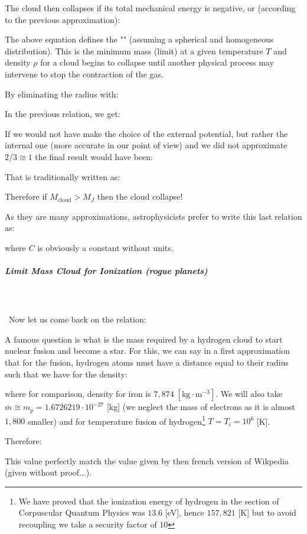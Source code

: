	The cloud then collapses if its total mechanical energy is negative, or (according to the previous approximation):
	
	The above equation defines the "" (assuming a spherical and homogeneous distribution). This is the minimum mass (limit) at a given temperature $T$ and density $\rho$ for a cloud begins to collapse until another physical process may intervene to stop the contraction of the gas.
	
	By eliminating the radius with:
	
	In the previous relation, we get:
	
	If we would not have make the choice of the external potential, but rather the internal one (more accurate in our point of view) and we did not approximate $2/3\cong 1$ the final result would have been:
	
	That is traditionally written as:
	
	Therefore if $M_\text{cloud}>M_J$ then the cloud collapse!
	
	As they are many approximations, astrophysicists prefer to write this last relation as:
	
	where $C$ is obviously a constant without units.
	
	\pagebreak
	\subparagraph{Limit Mass Cloud for Ionization (rogue planets)}\mbox{}\\\\\
	Now let us come back on the relation:
	
	A famous question is what is the mass required by a hydrogen cloud to start nuclear fusion and become a star. For this, we can say in a first approximation that for the fusion, hydrogen atoms must have a distance equal to their radius such that we have for the density:
	
	where for comparison, density for iron is $7,874\;[\text{kg}\cdot \text{m}^{-3}]$. We will also take $\overline{m}\cong m_p = 1.6726219\cdot 10^{-27}$ [kg] (we neglect the mass of electrons as it is almost $1,800$ smaller) and for temperature fusion of hydrogen\footnote{We have proved that the ionization energy of hydrogen in the section of Corpuscular Quantum Physics was $13.6$ [eV], hence $157,821$ [K] but to avoid recoupling we take a security factor of $10$} $T=T_i=10^6$ [K].
	
	Therefore:
	
	This value perfectly match the value given by then french version of Wikpedia (given without proof...).
	
